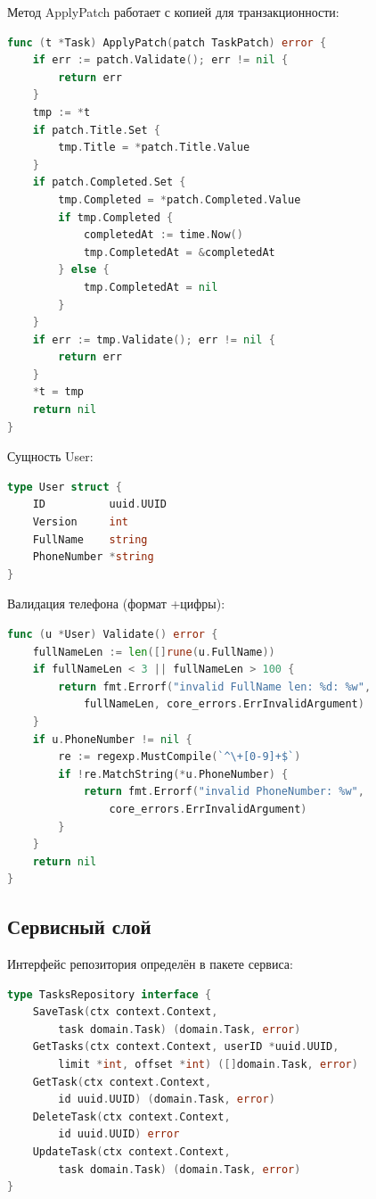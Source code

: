 \documentclass[a4paper,14pt]{extarticle}
\begin{document}
Метод ApplyPatch работает с копией для транзакционности:

\begin{lstlisting}[language=Go]
func (t *Task) ApplyPatch(patch TaskPatch) error {
    if err := patch.Validate(); err != nil {
        return err
    }
    tmp := *t
    if patch.Title.Set {
        tmp.Title = *patch.Title.Value
    }
    if patch.Completed.Set {
        tmp.Completed = *patch.Completed.Value
        if tmp.Completed {
            completedAt := time.Now()
            tmp.CompletedAt = &completedAt
        } else {
            tmp.CompletedAt = nil
        }
    }
    if err := tmp.Validate(); err != nil {
        return err
    }
    *t = tmp
    return nil
}
\end{lstlisting}

Сущность User:

\begin{lstlisting}[language=Go]
type User struct {
    ID          uuid.UUID
    Version     int
    FullName    string
    PhoneNumber *string
}
\end{lstlisting}

Валидация телефона (формат +цифры):

\begin{lstlisting}[language=Go]
func (u *User) Validate() error {
    fullNameLen := len([]rune(u.FullName))
    if fullNameLen < 3 || fullNameLen > 100 {
        return fmt.Errorf("invalid FullName len: %d: %w",
            fullNameLen, core_errors.ErrInvalidArgument)
    }
    if u.PhoneNumber != nil {
        re := regexp.MustCompile(`^\+[0-9]+$`)
        if !re.MatchString(*u.PhoneNumber) {
            return fmt.Errorf("invalid PhoneNumber: %w",
                core_errors.ErrInvalidArgument)
        }
    }
    return nil
}
\end{lstlisting}

\subsection{Сервисный слой}

Интерфейс репозитория определён в пакете сервиса:

\begin{lstlisting}[language=Go]
type TasksRepository interface {
    SaveTask(ctx context.Context,
        task domain.Task) (domain.Task, error)
    GetTasks(ctx context.Context, userID *uuid.UUID,
        limit *int, offset *int) ([]domain.Task, error)
    GetTask(ctx context.Context,
        id uuid.UUID) (domain.Task, error)
    DeleteTask(ctx context.Context,
        id uuid.UUID) error
    UpdateTask(ctx context.Context,
        task domain.Task) (domain.Task, error)
}
\end{lstlisting}
\end{document}
